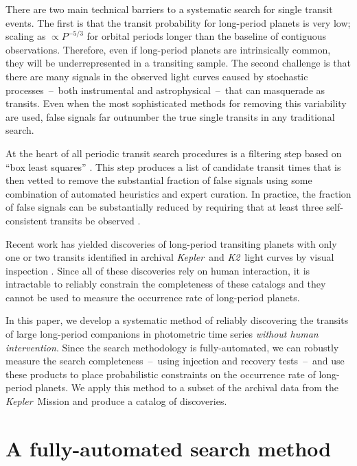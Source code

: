 \documentclass[manuscript, letterpaper]{aastex6}
\newcommand{\project}[1]{\textsl{#1}}
\newcommand{\kepler}{\project{Kepler}}
\newcommand{\KT}{\project{K2}}
\newcommand{\bls}{\project{BLS}}
\newcommand{\paper}{paper}
\begin{document}
There are two main technical barriers to a systematic search for single
transit events.
The first is that the transit probability for long-period planets is very low;
scaling as $\propto P^{-5/3}$ for orbital periods longer than the
baseline of contiguous observations.
Therefore, even if long-period planets are intrinsically common, they will
be underrepresented in a transiting sample.
The second challenge is that there are many signals in the observed light
curves caused by stochastic processes~--~both instrumental and
astrophysical~--~that can masquerade as transits.
Even when the most sophisticated methods for removing this variability are
used, false signals far outnumber the true single transits in any traditional
search.

At the heart of all periodic transit search procedures is a filtering step
based on ``box least squares'' \citep[\bls;][]{Kovacs:2002}.
This step produces a list of candidate transit times that is then vetted to
remove the substantial fraction of false signals using some combination of
automated heuristics and expert curation.
In practice, the fraction of false signals can be substantially reduced by
requiring that at least three self-consistent transits be observed \citep[The
\kepler\ Data Processing Handbook%
\footnote{\url{https://archive.stsci.edu/kepler/manuals/KSCI-19081-001_Data_Processing_Handbook.pdf}};][]{Petigura:2013,
Burke:2014, Rowe:2015, Coughlin:2015}.

Recent work has yielded discoveries of long-period transiting planets with
only one or two transits identified in archival \kepler\ and \KT\ light curves
by visual inspection \citep{Wang:2013, Kipping:2014a, Osborn:2016,
Kipping:2016, Uehara:2016, Wang:2015}.
Since all of these discoveries rely on human interaction, it is intractable to
reliably constrain the completeness of these catalogs and they cannot be used
to measure the occurrence rate of long-period planets.

In this \paper, we develop a systematic method of reliably discovering the
transits of large long-period companions in photometric time series
\emph{without human intervention}.
Since the search methodology is fully-automated, we can robustly measure the
search completeness~--~using injection and recovery tests~--~and use these
products to place probabilistic constraints on the occurrence rate of
long-period planets.
We apply this method to a subset of the archival data from the \kepler\
Mission and produce a catalog of discoveries.


\section{A fully-automated search method}
\end{document}
